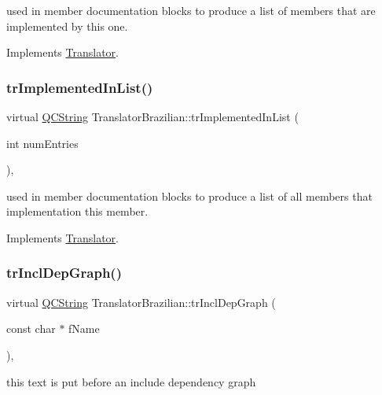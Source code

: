 used in member documentation blocks to produce a list of members that are implemented by this one. 

Implements \mbox{\hyperlink{class_translator}{Translator}}.

\mbox{\label{class_translator_brazilian_a7e80d93b08e19aac386ed7430f2e07be}} 
\subsubsection{\texorpdfstring{trImplementedInList()}{trImplementedInList()}}
{\footnotesize\ttfamily virtual \mbox{\hyperlink{class_q_c_string}{Q\+C\+String}} Translator\+Brazilian\+::tr\+Implemented\+In\+List (\begin{DoxyParamCaption}\item[{int}]{num\+Entries }\end{DoxyParamCaption})\hspace{0.3cm}{\ttfamily [inline]}, {\ttfamily [virtual]}}

used in member documentation blocks to produce a list of all members that implementation this member. 

Implements \mbox{\hyperlink{class_translator}{Translator}}.

\mbox{\label{class_translator_brazilian_aac920cc2efec542f767b62ba5537cdde}} 
\subsubsection{\texorpdfstring{trInclDepGraph()}{trInclDepGraph()}}
{\footnotesize\ttfamily virtual \mbox{\hyperlink{class_q_c_string}{Q\+C\+String}} Translator\+Brazilian\+::tr\+Incl\+Dep\+Graph (\begin{DoxyParamCaption}\item[{const char $\ast$}]{f\+Name }\end{DoxyParamCaption})\hspace{0.3cm}{\ttfamily [inline]}, {\ttfamily [virtual]}}

this text is put before an include dependency graph 

